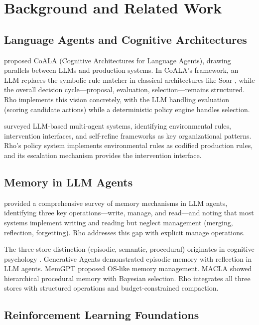 \documentclass[letterpaper]{article}
\begin{document}
\section{Background and Related Work}

\subsection{Language Agents and Cognitive Architectures}

\citet{sumers2024cognitive} proposed CoALA (Cognitive Architectures for Language Agents), drawing parallels between LLMs and production systems. In CoALA's framework, an LLM replaces the symbolic rule matcher in classical architectures like Soar \citep{laird2012soar}, while the overall decision cycle---proposal, evaluation, selection---remains structured. Rho implements this vision concretely, with the LLM handling evaluation (scoring candidate actions) while a deterministic policy engine handles selection.

\citet{wang2024survey} surveyed LLM-based multi-agent systems, identifying environmental rules, intervention interfaces, and self-refine frameworks as key organizational patterns. Rho's policy system implements environmental rules as codified production rules, and its escalation mechanism provides the intervention interface.

\subsection{Memory in LLM Agents}

\citet{zhang2024survey} provided a comprehensive survey of memory mechanisms in LLM agents, identifying three key operations---write, manage, and read---and noting that most systems implement writing and reading but neglect management (merging, reflection, forgetting). Rho addresses this gap with explicit manage operations.

The three-store distinction (episodic, semantic, procedural) originates in cognitive psychology \citep{tulving1972episodic, anderson1983architecture}. Generative Agents \citep{park2023generative} demonstrated episodic memory with reflection in LLM agents. MemGPT \citep{packer2023memgpt} proposed OS-like memory management. MACLA \citep{forouzandeh2025macla} showed hierarchical procedural memory with Bayesian selection. Rho integrates all three stores with structured operations and budget-constrained compaction.

\subsection{Reinforcement Learning Foundations}
\end{document}
